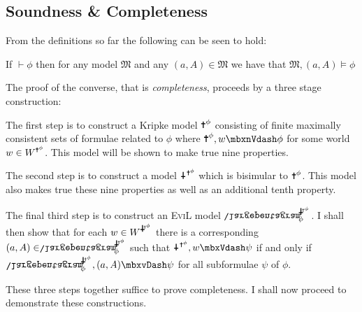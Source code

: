 \subsection{Soundness \& Completeness}


From the definitions so far the following can be seen to hold:
\begin{lemma}[Soundness]
If $\vdash \phi$ then for any model $\mathfrak{M}$ and any $(a,A) \in \mathfrak{M}$ we have that $\mathfrak{M},(a,A) \models \phi$ 
\end{lemma}

The proof of the converse, that is \emph{completeness}, proceeds by a three stage construction:
\begin{bul}
\item The first step is to construct a Kripke model $\Cross^\phi$ consisting of finite maximally consistent sets of formulae related to $\phi$ where $\Cross^\phi,w \nVdash \phi$ for some world $w \in W^{\Cross^\phi}$. This model will be shown to make true nine properties.
\item The second step is to construct a model ${\iCross^{\Cross^\phi}}$ which is bisimular to $\Cross^\phi$. This model also makes true these nine properties as well as an additional tenth property.
\item The final third step is to construct an \textsc{EviL} model ${\ipent^{\iCross^{\Cross^\phi}}_\phi}$.
I shall then show that for each $w \in W^{\iCross^{\Cross^\phi}}$ there is a corresponding $(a,A) \in \ipent^{\iCross^{\Cross^\phi}}_\phi$ such that ${\iCross^{\Cross^\phi}}, w \Vdash \psi$ if and only if ${\ipent^{\iCross^{\Cross^\phi}}_\phi},(a,A) \models \psi$ for all subformulae $\psi$ of $\phi$.
\end{bul}
These three steps together suffice to prove completeness.  I shall now proceed to demonstrate these constructions.
